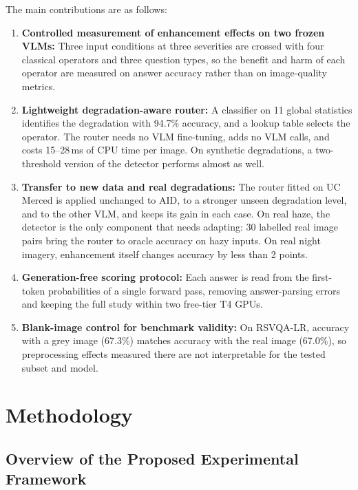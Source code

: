 \documentclass[lettersize,journal]{IEEEtran}
\begin{document}
The main contributions are as follows:

\begin{enumerate}
    \item \textbf{Controlled measurement of enhancement effects on two frozen VLMs:} Three input conditions at three severities are crossed with four classical operators and three question types, so the benefit and harm of each operator are measured on answer accuracy rather than on image-quality metrics.

    \item \textbf{Lightweight degradation-aware router:} A classifier on 11 global statistics identifies the degradation with 94.7\% accuracy, and a lookup table selects the operator. The router needs no VLM fine-tuning, adds no VLM calls, and costs 15--28\,ms of CPU time per image. On synthetic degradations, a two-threshold version of the detector performs almost as well.

    \item \textbf{Transfer to new data and real degradations:} The router fitted on UC Merced is applied unchanged to AID, to a stronger unseen degradation level, and to the other VLM, and keeps its gain in each case. On real haze, the detector is the only component that needs adapting: 30 labelled real image pairs bring the router to oracle accuracy on hazy inputs. On real night imagery, enhancement itself changes accuracy by less than 2 points.

    \item \textbf{Generation-free scoring protocol:} Each answer is read from the first-token probabilities of a single forward pass, removing answer-parsing errors and keeping the full study within two free-tier T4 GPUs.

    \item \textbf{Blank-image control for benchmark validity:} On RSVQA-LR, accuracy with a grey image (67.3\%) matches accuracy with the real image (67.0\%), so preprocessing effects measured there are not interpretable for the tested subset and model.
\end{enumerate}


\section{Methodology}

\subsection{Overview of the Proposed Experimental Framework}
\end{document}
